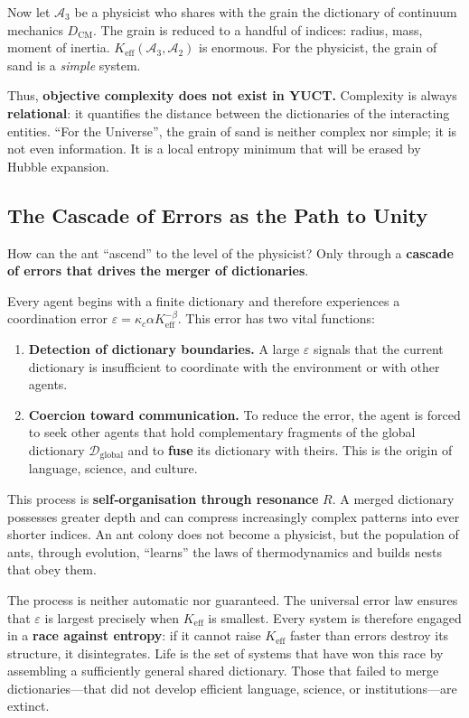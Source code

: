 \documentclass[12pt,a4paper]{article}
\newcommand{\Keff}{K_{\mathrm{eff}}}
\begin{document}
	Now let \(\mathcal{A}_3\) be a physicist who shares with the grain the dictionary of continuum mechanics \(D_{\text{CM}}\). The grain is reduced to a handful of indices: radius, mass, moment of inertia. \(\Keff(\mathcal{A}_3, \mathcal{A}_2)\) is enormous. For the physicist, the grain of sand is a \emph{simple} system.
	
	Thus, \textbf{objective complexity does not exist in YUCT.} Complexity is always \textbf{relational}: it quantifies the distance between the dictionaries of the interacting entities. ``For the Universe'', the grain of sand is neither complex nor simple; it is not even information. It is a local entropy minimum that will be erased by Hubble expansion.
	
	\subsection{The Cascade of Errors as the Path to Unity}
	\label{subsec:cascade}
	
	How can the ant ``ascend'' to the level of the physicist? Only through a \textbf{cascade of errors that drives the merger of dictionaries}.
	
	Every agent begins with a finite dictionary and therefore experiences a coordination error \(\varepsilon = \kappa_c \alpha \Keff^{-\beta}\). This error has two vital functions:
	
	\begin{enumerate}[leftmargin=*]
		\item \textbf{Detection of dictionary boundaries.} A large \(\varepsilon\) signals that the current dictionary is insufficient to coordinate with the environment or with other agents.
		\item \textbf{Coercion toward communication.} To reduce the error, the agent is forced to seek other agents that hold complementary fragments of the global dictionary \(\mathcal{D}_{\text{global}}\) and to \textbf{fuse} its dictionary with theirs. This is the origin of language, science, and culture.
	\end{enumerate}
	
	This process is \textbf{self‑organisation through resonance} \(R\). A merged dictionary possesses greater depth and can compress increasingly complex patterns into ever shorter indices. An ant colony does not become a physicist, but the population of ants, through evolution, ``learns'' the laws of thermodynamics and builds nests that obey them.
	
	The process is neither automatic nor guaranteed. The universal error law ensures that \(\varepsilon\) is largest precisely when \(\Keff\) is smallest. Every system is therefore engaged in a \textbf{race against entropy}: if it cannot raise \(\Keff\) faster than errors destroy its structure, it disintegrates. Life is the set of systems that have won this race by assembling a sufficiently general shared dictionary. Those that failed to merge dictionaries---that did not develop efficient language, science, or institutions---are extinct.
	
\end{document}
